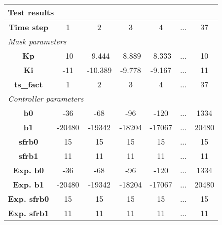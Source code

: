 \vspace{1em}
\begin{tabularx}{\textwidth}{|c|c|c|c|c|>{\centering\arraybackslash}X|c|}
\hline
\multicolumn{7}{|l|}{\cellcolor[gray]{0.8}\textbf{Test results}} \tabularnewline \hline
\textbf{Time step} & 1 & 2 & 3 & 4 & ... & 37 \tabularnewline \hline
\multicolumn{7}{|l|}{\cellcolor[gray]{0.9}\textit{Mask parameters}} \tabularnewline \hline
\textbf{Kp} & -10 & -9.444 & -8.889 & -8.333 & ... & 10 \tabularnewline \hline
\textbf{Ki} & -11 & -10.389 & -9.778 & -9.167 & ... & 11 \tabularnewline \hline
\textbf{ts\_fact} & 1 & 2 & 3 & 4 & ... & 37 \tabularnewline \hline
\multicolumn{7}{|l|}{\cellcolor[gray]{0.9}\textit{Controller parameters}} \tabularnewline \hline
\textbf{b0} & -36 & -68 & -96 & -120 & ... & 1334 \tabularnewline \hline
\textbf{b1} & -20480 & -19342 & -18204 & -17067 & ... & 20480 \tabularnewline \hline
\textbf{sfrb0} & 15 & 15 & 15 & 15 & ... & 15 \tabularnewline \hline
\textbf{sfrb1} & 11 & 11 & 11 & 11 & ... & 11 \tabularnewline \hline
\textbf{Exp. b0} & -36 & -68 & -96 & -120 & ... & 1334 \tabularnewline \hline
\textbf{Exp. b1} & -20480 & -19342 & -18204 & -17067 & ... & 20480 \tabularnewline \hline
\textbf{Exp. sfrb0} & 15 & 15 & 15 & 15 & ... & 15 \tabularnewline \hline
\textbf{Exp. sfrb1} & 11 & 11 & 11 & 11 & ... & 11 \tabularnewline \hline
\end{tabularx}
\vspace{1ex}

